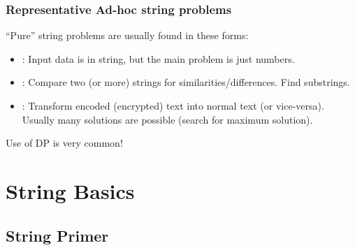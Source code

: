 \documentclass{beamer}
\begin{document}
\begin{frame}
  \frametitle{Representative Ad-hoc string problems}
  {\smaller

    ``Pure'' string problems are usually found in these forms:
    
  \begin{exampleblock}{}
    \begin{itemize}
    \item {}: Input data is in string, but
      the main problem is just numbers.
    \item {}: Compare two (or more) strings for
      similarities/differences. Find substrings.
    \item {}: Transform encoded (encrypted)
      text into normal text (or vice-versa). Usually many solutions are
      possible (search for maximum solution).
    \end{itemize}
  \end{exampleblock}

  \bigskip

  Use of DP is very common!
  }
\end{frame}

\section{String Basics}

\subsection{String Primer}
\end{document}
